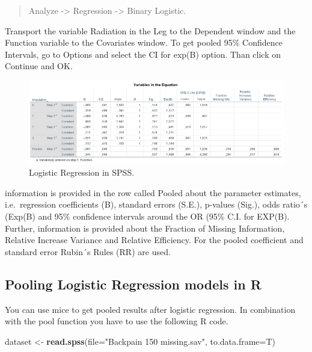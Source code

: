 \documentclass[]{book}
\newenvironment{Shaded}{\begin{snugshade}}{\end{snugshade}}
\newcommand{\KeywordTok}[1]{\textcolor[rgb]{0.13,0.29,0.53}{\textbf{#1}}}
\newcommand{\DataTypeTok}[1]{\textcolor[rgb]{0.13,0.29,0.53}{#1}}
\newcommand{\StringTok}[1]{\textcolor[rgb]{0.31,0.60,0.02}{#1}}
\newcommand{\NormalTok}[1]{#1}
\theoremstyle{definition}
\theoremstyle{definition}
\theoremstyle{definition}
\theoremstyle{remark}
\begin{document}
\begin{quote}
Analyze -\textgreater{} Regression -\textgreater{} Binary Logistic.
\end{quote}

Transport the variable Radiation in the Leg to the Dependent window and
the Function variable to the Covariates window. To get pooled 95\%
Confidence Intervals, go to Options and select the CI for exp(B) option.
Than click on Continue and OK.

\begin{figure}

{\centering \includegraphics[width=0.9\linewidth]{images/table5.9} 

}

\caption{Logistic Regression in SPSS.}\label{fig:tab5-9}
\end{figure}

information is provided in the row called Pooled about the parameter
estimates, i.e.~regression coefficients (B), standard errors (S.E.),
p-values (Sig.), odds ratio´s (Exp(B) and 95\% confidence intervals
around the OR (95\% C.I. for EXP(B). Further, information is provided
about the Fraction of Missing Information, Relative Increase Variance
and Relative Efficiency. For the pooled coefficient and standard error
Rubin´s Rules (RR) are used.

\subsection{Pooling Logistic Regression models in
R}\label{pooling-logistic-regression-models-in-r}

You can use mice to get pooled results after logistic regression. In
combination with the pool function you have to use the following R code.

\begin{Shaded}
\begin{Highlighting}[]
\NormalTok{dataset <-}\StringTok{ }\KeywordTok{read.spss}\NormalTok{(}\DataTypeTok{file=}\StringTok{"Backpain 150 missing.sav"}\NormalTok{, }\DataTypeTok{to.data.frame=}\NormalTok{T)}
\end{Highlighting}
\end{Shaded}
\end{document}
